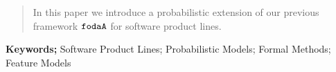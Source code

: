 \begin{abstract}
  In this paper we introduce a probabilistic extension of our previous 
  framework $\mathtt{fodaA}$ for software product lines.
\end{abstract}
\textbf{Keywords;} Software Product Lines; Probabilistic Models; Formal Methods; Feature Models


